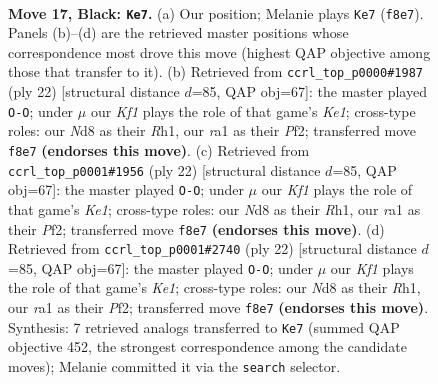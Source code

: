 \documentclass[11pt]{article}
\begin{document}
\clearpage

\begin{figure}[p]\centering
\begin{subfigure}{0.46\textwidth}\centering
\resizebox{\linewidth}{!}{%
\newchessgame
\chessboard[
  setfen={r1bnrk2/1ppp1ppp/p2q4/B2P4/4n3/4PNP1/PP3PBP/R2Q1RK1 b - - 10 17},
  showmover=false,
  pgfstyle=straightmove, color=movearrow, markmove={f8-e7}
]}
\caption{}
\end{subfigure}\hfill
\begin{subfigure}{0.46\textwidth}\centering
\resizebox{\linewidth}{!}{%
\newchessgame
\chessboard[
  setfen={rn1q1rk1/pb3p1p/1pp2bp1/3p4/Q2P4/P1N2NP1/1P2PPBP/R3K2R w KQ - 0 12},
  showmover=false,
  pgfstyle=straightmove, color=movearrow, markmove={e1-g1}
]}
\caption{}
\end{subfigure}
\\[4pt]
\begin{subfigure}{0.46\textwidth}\centering
\resizebox{\linewidth}{!}{%
\newchessgame
\chessboard[
  setfen={rn1q1rk1/pb3p1p/1pp2bp1/3p4/Q2P4/P1N2NP1/1P2PPBP/R3K2R w KQ - 2 12},
  showmover=false,
  pgfstyle=straightmove, color=movearrow, markmove={e1-g1}
]}
\caption{}
\end{subfigure}\hfill
\begin{subfigure}{0.46\textwidth}\centering
\resizebox{\linewidth}{!}{%
\newchessgame
\chessboard[
  setfen={rn1q1rk1/pb3p1p/1pp2bp1/3p4/Q2P4/P1N2NP1/1P2PPBP/R3K2R w KQ - 0 12},
  showmover=false,
  pgfstyle=straightmove, color=movearrow, markmove={e1-g1}
]}
\caption{}
\end{subfigure}
\caption{\textbf{Move 17, Black: \texttt{Ke7}.} (a) Our position; Melanie plays \texttt{Ke7} (\texttt{f8e7}). Panels (b)--(d) are the retrieved master positions whose correspondence most drove this move (highest QAP objective among those that transfer to it). (b) Retrieved from \texttt{ccrl\_top\_p0000\#1987} (ply 22) [structural distance $d$=85, QAP obj=67]: the master played \texttt{O-O}; under $\mu$ our \emph{Kf1} plays the role of that game's \emph{Ke1}; cross-type roles: our \emph{N}d8 as their \emph{R}h1, our \emph{r}a1 as their \emph{P}f2; transferred move \texttt{f8e7} \textbf{(endorses this move)}. (c) Retrieved from \texttt{ccrl\_top\_p0001\#1956} (ply 22) [structural distance $d$=85, QAP obj=67]: the master played \texttt{O-O}; under $\mu$ our \emph{Kf1} plays the role of that game's \emph{Ke1}; cross-type roles: our \emph{N}d8 as their \emph{R}h1, our \emph{r}a1 as their \emph{P}f2; transferred move \texttt{f8e7} \textbf{(endorses this move)}. (d) Retrieved from \texttt{ccrl\_top\_p0001\#2740} (ply 22) [structural distance $d$=85, QAP obj=67]: the master played \texttt{O-O}; under $\mu$ our \emph{Kf1} plays the role of that game's \emph{Ke1}; cross-type roles: our \emph{N}d8 as their \emph{R}h1, our \emph{r}a1 as their \emph{P}f2; transferred move \texttt{f8e7} \textbf{(endorses this move)}. Synthesis: 7 retrieved analogs transferred to \texttt{Ke7} (summed QAP objective 452, the strongest correspondence among the candidate moves); Melanie committed it via the \texttt{search} selector.}
\label{fig:thought-m33}
\end{figure}
\end{document}
